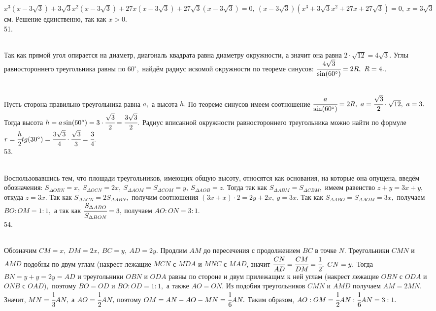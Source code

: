 $x^3(x-3\sqrt{3})+3\sqrt{3}x^2(x-3\sqrt{3})+27x(x-3\sqrt{3})+27\sqrt{3}(x-3\sqrt{3})=0,\ (x-3\sqrt{3})(x^3+3\sqrt{3}x^2+27x+27\sqrt{3})=0,\ x=3\sqrt{3}$см. Решение единственно, так как $x>0.$\\
51. \begin{figure}[ht!]
\end{figure}\\
Так как прямой угол опирается на диаметр, диагональ квадрата равна диаметру окружности, а значит она равна $2\cdot\sqrt{12}=4\sqrt{3}.$ Углы равностороннего треугольника равны по $60^\circ,$ найдём радиус искомой окружности по теореме синусов: $\cfrac{4\sqrt{3}}{\sin(60^\circ)}=2R,\ R=4.$\newpage{}. \begin{figure}[ht!]
\end{figure}\\
Пусть сторона правильно треугольника равна $a,$ а высота $h.$ По теореме синусов имеем соотношение $\cfrac{a}{\sin(60^\circ)}=2R,\ a=\cfrac{\sqrt{3}}{2}\cdot\sqrt{12},\ a=3.$ Тогда высота $h=a\sin(60^\circ)=3\cdot\cfrac{\sqrt{3}}{2}=\cfrac{3\sqrt{3}}{2}.$ Радиус вписанной окружности равностороннего треугольника можно найти по формуле $r=\cfrac{h}{2}tg(30^\circ)=\cfrac{3\sqrt{3}}{4}\cdot\cfrac{\sqrt{3}}{3}=\cfrac{3}{4}.$\\
53. \begin{figure}[ht!]
\end{figure}\\
Воспользовавшись тем, что площади треугольников, имеющих общую высоту, относятся как основания, на которые она опущена, введём обозначения: $S_{\Delta OBN}=x,\ S_{\Delta OCN}=2x,\ S_{\Delta AOM}=S_{\Delta COM}=y,\ S_{\Delta AOB}=z.$ Тогда так как $S_{\Delta ABM}=S_{\Delta CBM},$ имеем равенство $z+y=3x+y,$ откуда $z=3x.$ Так как $S_{\Delta ACN}=2S_{\Delta ABN},$ получим соотношения $(3x+x)\cdot2=2y+2x,\ y=3x.$ Так как $S_{\Delta ABO}=S_{\Delta AOM}=3x,$ получаем $BO:OM=1:1,$ а так как $\cfrac{S_{\Delta ABO}}{S_{\Delta BON}}=3,$ получаем $AO:ON=3:1.$\\
54. \begin{figure}[ht!]
\end{figure}\\
Обозначим $CM=x,\ DM=2x,\ BC=y,\ AD=2y.$ Продлим $AM$ до пересечения с продолжением $BC$ в точке $N.$ Треугольники $CMN$ и $AMD$ подобны по двум углам (накрест лежащие  $MCN$ с $MDA$ и $MNC$ с $MAD$, значит $\cfrac{CN}{AD}=\cfrac{CM}{DM}=\cfrac{1}{2},\ CN=y.$ Тогда $BN=y+y=2y=AD$ и треугольники $OBN$ и $ODA$ равны по стороне и двум прилежащим к ней углам (накрест лежащие $OBN$ с $ODA$ и $ONB$ с $OAD),$ поэтому $BO=OD$ и $BO:OD=1:1,$ а также $AO=ON.$ Из подобия треугольников $CMN$ и $AMD$ получаем $AM=2MN.$ Значит, $MN=\cfrac{1}{3}AN,$ а $AO=\cfrac{1}{2}AN,$ поэтому $OM=AN-AO-MN=\cfrac{1}{6}AN.$ Таким образом, $AO:OM=\cfrac{1}{2}AN:\cfrac{1}{6}AN=3:1.$\\
